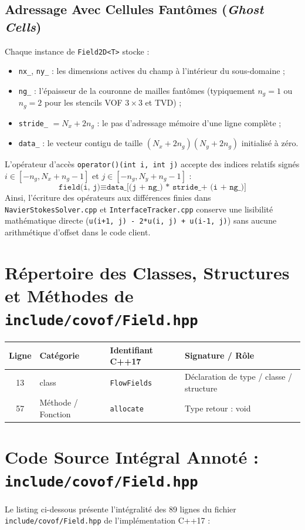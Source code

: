 \documentclass[10pt,a4paper,oneside]{book}
\begin{document}
\subsection{Adressage Avec Cellules Fantômes (\emph{Ghost Cells})}
Chaque instance de \texttt{Field2D<T>} stocke :
\begin{itemize}
  \item \texttt{nx\_}, \texttt{ny\_} : les dimensions actives du champ à l'intérieur du sous-domaine ;
  \item \texttt{ng\_} : l'épaisseur de la couronne de mailles fantômes (typiquement $n_g = 1$ ou $n_g = 2$ pour les stencils VOF $3\times 3$ et TVD) ;
  \item \texttt{stride\_} $= N_x + 2 n_g$ : le pas d'adressage mémoire d'une ligne complète ;
  \item \texttt{data\_} : le vecteur contigu de taille $(N_x + 2n_g)(N_y + 2n_g)$ initialisé à zéro.
\end{itemize}
L'opérateur d'accès \texttt{operator()(int i, int j)} accepte des indices relatifs signés $i \in [-n_g, N_x + n_g - 1]$ et $j \in [-n_g, N_y + n_g - 1]$ :
\begin{equation}
  \texttt{field(i, j)} \equiv \texttt{data\_[(j + ng\_) * stride\_ + (i + ng\_)]}
\end{equation}
Ainsi, l'écriture des opérateurs aux différences finies dans \texttt{NavierStokesSolver.cpp} et \texttt{InterfaceTracker.cpp} conserve une lisibilité mathématique directe (\texttt{u(i+1, j) - 2*u(i, j) + u(i-1, j)}) sans aucune arithmétique d'offset dans le code client.

\section{Répertoire des Classes, Structures et Méthodes de \texttt{include/covof/Field.hpp}}
\begin{center}\small
\begin{tabular}{clll}
\toprule
\textbf{Ligne} & \textbf{Catégorie} & \textbf{Identifiant C++17} & \textbf{Signature / Rôle} \\
\midrule
13 & class & \texttt{FlowFields} & Déclaration de type / classe / structure \\
57 & Méthode / Fonction & \texttt{allocate} & Type retour : void \\
\bottomrule
\end{tabular}
\end{center}

\section{Code Source Intégral Annoté : \texttt{include/covof/Field.hpp}}
Le listing ci-dessous présente l'intégralité des 89 lignes du fichier \texttt{include/covof/Field.hpp} de l'implémentation C++17 :
\end{document}
